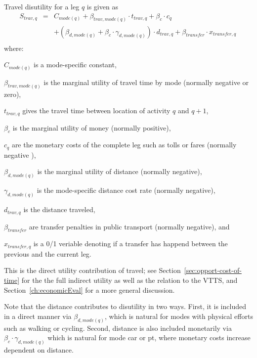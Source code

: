 Travel disutility for a leg $q$ is given as 
\begin{equation}
\label{eq:tdisutility}
\begin{matrix}
S_{trav, q} & = & C_{mode(q)} + \beta_{trav, mode(q)} \cdot t_{trav, q} + \beta_{c} \cdot c_q  
\\ & & + (\beta_{d, mode(q)} + \beta_{c} \cdot \gamma_{d, mode(q)}) \cdot d_{trav,q} 
%
+ \beta_{transfer} \cdot x_{transfer,q} \, \\
\end{matrix}
\end{equation} 
where:
\begin{compactitem} 
\item $C_{mode(q)}$ is a mode-specific constant,
\item $\beta_{trav, mode(q)}$ is the marginal utility of travel time by mode (normally negative or zero),
\item $t_{trav, q}$ gives the travel time between location of activity $q$ and $q+1$,
\item $\beta_{c}$ is the marginal utility of money (normally positive),
\item $c_q$ are the monetary costs of the complete leg such as tolls or fares (normally negative ),
\item $\beta_{d, mode(q)}$ is the  marginal utility of distance (normally negative),
\item $\gamma_{d, mode(q)}$ is the mode-specific distance cost rate (normally negative),
\item $d_{trav, q}$ is the distance traveled, 
\item $\beta_{transfer}$ are transfer penalties in public transport (normally negative),
and
\item $x_{transfer,q}$ is a 0/1 veriable denoting if a transfer has happend between the previous and the current leg.
\end{compactitem}
This is the direct utility contribution of travel; see Section~\ref{sec:opport-cost-of-time} for the the full indirect utility as well as the relation to the VTTS, and Section~\ref{ch:economicEval} for a more general discussion.

Note that the distance contributes to disutility in two ways. First, it is included in a direct manner via $\beta_{d, mode(q)}$, which is natural for modes with physical efforts such as walking or cycling. Second, distance is also included monetarily via $\beta_c \cdot \gamma_{d, mode(q)}$ which is natural for mode car or pt, where monetary costs increase dependent on distance.

